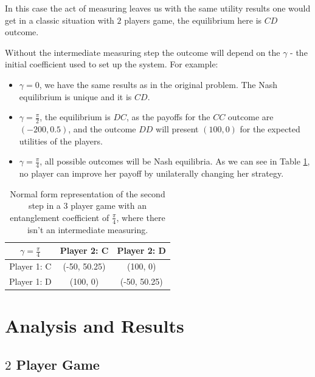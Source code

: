 In this case the act of measuring leaves us with the same utility results one would get in a classic situation with $2$ players game, the equilibrium here is $CD$ outcome. 

Without the intermediate measuring step the outcome will depend on the $\gamma$ - the initial coefficient used to set up the system. For example:

\begin{itemize}
\item $\gamma = 0$, we have the same results as in the original problem. The Nash equilibrium is unique and it is $CD$.
\item $\gamma = \frac{\pi}{2}$, the equilibrium is $DC$, as the payoffs for the $CC$ outcome are $(-200, 0.5)$, and the outcome $DD$ will present $(100, 0)$ for the expected utilities of the players.
\item $\gamma = \frac{\pi}{4}$, all possible outcomes will be Nash equilibria. As we can see in Table \ref{tab:hate_myself}, no player can improve her payoff by unilaterally changing her strategy.



\end{itemize}

\begin{center}
\begin{table}
\begin{centering}
\begin{tabular}{ccc}
\hline 
 $\gamma = \frac{\pi}{4}$ & Player 2: C & Player 2: D\tabularnewline
\hline 
Player 1: C & (-50, 50.25) & (100, 0)\tabularnewline
Player 1: D & (100, 0) & (-50, 50.25)\tabularnewline
\hline 
\end{tabular}
\par\end{centering}

\caption{Normal form representation of the second step in a 3 player game with an entanglement coefficient of $\frac{\pi}{4}$, where there isn't an intermediate measuring. }
\label{tab:hate_myself}
\end{table}
\end{center}


\section{Analysis and Results}
\label{sec:description_3}

\subsection{$2$ Player Game}
\label{subsec:2playergame}




